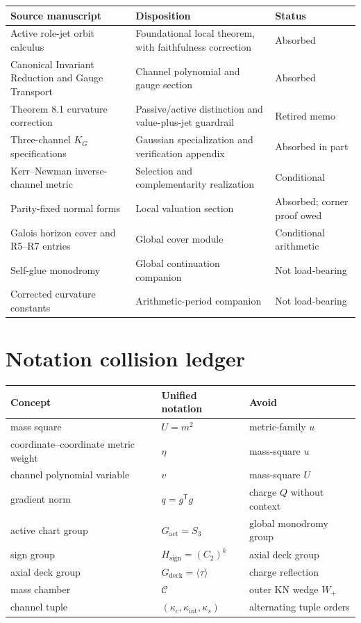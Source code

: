 \documentclass[11pt]{article}
\theoremstyle{remark}
\newcommand{\kc}{\kappa_c}
\newcommand{\ks}{\kappa_s}
\newcommand{\kint}{\kappa_{\mathrm{int}}}
\newcommand{\Cham}{\mathcal C}
\newcommand{\Wp}{W_+}
\begin{document}
\begin{center}
\small
\begin{tabular}{>{\raggedright\arraybackslash}p{}
>{\raggedright\arraybackslash}p{}
>{\raggedright\arraybackslash}p{}}
\toprule
Source manuscript & Disposition & Status\\
\midrule
Active role-jet orbit calculus &
Foundational local theorem, with faithfulness correction & Absorbed\\
Canonical Invariant Reduction and Gauge Transport &
Channel polynomial and gauge section & Absorbed\\
Theorem 8.1 curvature correction &
Passive/active distinction and value-plus-jet guardrail & Retired memo\\
Three-channel $K_G$ specifications &
Gaussian specialization and verification appendix & Absorbed in part\\
Kerr--Newman inverse-channel metric &
Selection and complementarity realization & Conditional\\
Parity-fixed normal forms &
Local valuation section & Absorbed; corner proof owed\\
Galois horizon cover and R5--R7 entries &
Global cover module & Conditional arithmetic\\
Self-glue monodromy & Global continuation companion & Not load-bearing\\
Corrected curvature constants & Arithmetic-period companion & Not load-bearing\\
\bottomrule
\end{tabular}
\end{center}

\section{Notation collision ledger}

\begin{center}
\begin{tabular}{lll}
\toprule
Concept & Unified notation & Avoid\\
\midrule
mass square & $U=m^2$ & metric-family $u$\\
coordinate--coordinate metric weight & $\eta$ & mass-square $u$\\
channel polynomial variable & $v$ & mass-square $U$\\
gradient norm & $q=g^{\mathsf T}g$ & charge $Q$ without context\\
active chart group & $G_{\mathrm{act}}=S_3$ & global monodromy group\\
sign group & $H_{\mathrm{sign}}=(C_2)^k$ & axial deck group\\
axial deck group & $G_{\mathrm{deck}}=\langle\tau\rangle$ & charge reflection\\
mass chamber & $\Cham$ & outer KN wedge $\Wp$\\
channel tuple & $(\kc,\kint,\ks)$ & alternating tuple orders\\
\bottomrule
\end{tabular}
\end{center}
\end{document}
